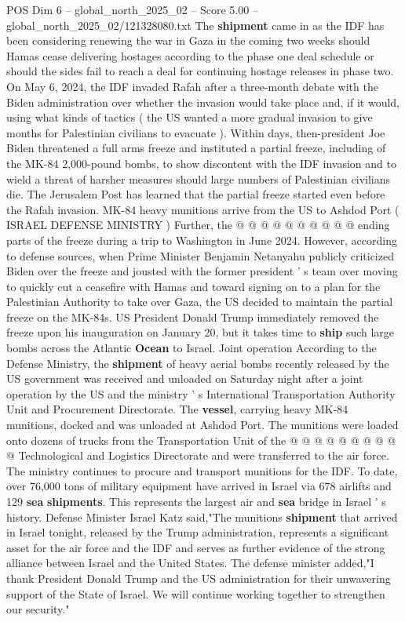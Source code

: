 \begin{textsample}{POS Dim 6 – global\_north\_2025\_02 – Score 5.00 – global\_north\_2025\_02/121328080.txt}  \label{ex:f6_pos_342}
The \textbf{shipment} came in as the IDF has been considering renewing the war in Gaza in the coming two weeks should Hamas cease delivering hostages according to the phase one deal schedule or should the sides fail to reach a deal for continuing hostage releases in phase two.
On May 6, 2024, the IDF invaded Rafah after a three-month debate with the Biden administration over whether the invasion would take place and, if it would, using what kinds of tactics ( the US wanted a more gradual invasion to give months for Palestinian civilians to evacuate ).
Within days, then-president Joe Biden threatened a full arms freeze and instituted a partial freeze, including of the MK-84 2,000-pound bombs, to show discontent with the IDF invasion and to wield a threat of harsher measures should large numbers of Palestinian civilians die.
The Jerusalem Post has learned that the partial freeze started even before the Rafah invasion.
MK-84 heavy munitions arrive from the US to Ashdod Port ( ISRAEL DEFENSE MINISTRY ) Further, the @ @ @ @ @ @ @ @ @ @ ending parts of the freeze during a trip to Washington in June 2024.
However, according to defense sources, when Prime Minister Benjamin Netanyahu publicly criticized Biden over the freeze and jousted with the former president ' s team over moving to quickly cut a ceasefire with Hamas and toward signing on to a plan for the Palestinian Authority to take over Gaza, the US decided to maintain the partial freeze on the MK-84s.
US President Donald Trump immediately removed the freeze upon his inauguration on January 20, but it takes time to \textbf{ship} such large bombs across the Atlantic \textbf{Ocean} to Israel.
Joint operation According to the Defense Ministry, the \textbf{shipment} of heavy aerial bombs recently released by the US government was received and unloaded on Saturday night after a joint operation by the US and the ministry ' s International Transportation Authority Unit and Procurement Directorate.
The \textbf{vessel}, carrying heavy MK-84 munitions, docked and was unloaded at Ashdod Port.
The munitions were loaded onto dozens of trucks from the Transportation Unit of the @ @ @ @ @ @ @ @ @ @ Technological and Logistics Directorate and were transferred to the air force.
The ministry continues to procure and transport munitions for the IDF.
To date, over 76,000 tons of military equipment have arrived in Israel via 678 airlifts and 129 \textbf{sea} \textbf{shipments}.
This represents the largest air and \textbf{sea} bridge in Israel ' s history.
Defense Minister Israel Katz said,"The munitions \textbf{shipment} that arrived in Israel tonight, released by the Trump administration, represents a significant asset for the air force and the IDF and serves as further evidence of the strong alliance between Israel and the United States.
The defense minister added,"I thank President Donald Trump and the US administration for their unwavering support of the State of Israel.
We will continue working together to strengthen our security."

\end{textsample}
